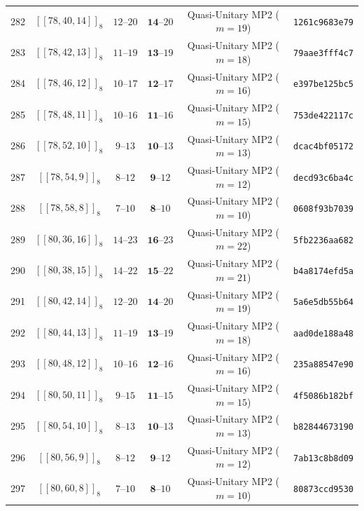 \documentclass[11pt,a4paper]{article}
\theoremstyle{remark}
\begin{document}
{\begin{longtable}{@{}rccccl@{}}
282 & $[[78,40,14]]_{8}$ & $12\text{--}20$ & $\mathbf{14}\text{--}20$ & Quasi-Unitary MP2 ($m=19$) & \texttt{1261c9683e79} \\
283 & $[[78,42,13]]_{8}$ & $11\text{--}19$ & $\mathbf{13}\text{--}19$ & Quasi-Unitary MP2 ($m=18$) & \texttt{79aae3fff4c7} \\
284 & $[[78,46,12]]_{8}$ & $10\text{--}17$ & $\mathbf{12}\text{--}17$ & Quasi-Unitary MP2 ($m=16$) & \texttt{e397be125bc5} \\
285 & $[[78,48,11]]_{8}$ & $10\text{--}16$ & $\mathbf{11}\text{--}16$ & Quasi-Unitary MP2 ($m=15$) & \texttt{753de422117c} \\
286 & $[[78,52,10]]_{8}$ & $9\text{--}13$ & $\mathbf{10}\text{--}13$ & Quasi-Unitary MP2 ($m=13$) & \texttt{dcac4bf05172} \\
287 & $[[78,54,9]]_{8}$ & $8\text{--}12$ & $\mathbf{9}\text{--}12$ & Quasi-Unitary MP2 ($m=12$) & \texttt{decd93c6ba4c} \\
288 & $[[78,58,8]]_{8}$ & $7\text{--}10$ & $\mathbf{8}\text{--}10$ & Quasi-Unitary MP2 ($m=10$) & \texttt{0608f93b7039} \\
289 & $[[80,36,16]]_{8}$ & $14\text{--}23$ & $\mathbf{16}\text{--}23$ & Quasi-Unitary MP2 ($m=22$) & \texttt{5fb2236aa682} \\
290 & $[[80,38,15]]_{8}$ & $14\text{--}22$ & $\mathbf{15}\text{--}22$ & Quasi-Unitary MP2 ($m=21$) & \texttt{b4a8174efd5a} \\
291 & $[[80,42,14]]_{8}$ & $12\text{--}20$ & $\mathbf{14}\text{--}20$ & Quasi-Unitary MP2 ($m=19$) & \texttt{5a6e5db55b64} \\
292 & $[[80,44,13]]_{8}$ & $11\text{--}19$ & $\mathbf{13}\text{--}19$ & Quasi-Unitary MP2 ($m=18$) & \texttt{aad0de188a48} \\
293 & $[[80,48,12]]_{8}$ & $10\text{--}16$ & $\mathbf{12}\text{--}16$ & Quasi-Unitary MP2 ($m=16$) & \texttt{235a88547e90} \\
294 & $[[80,50,11]]_{8}$ & $9\text{--}15$ & $\mathbf{11}\text{--}15$ & Quasi-Unitary MP2 ($m=15$) & \texttt{4f5086b182bf} \\
295 & $[[80,54,10]]_{8}$ & $8\text{--}13$ & $\mathbf{10}\text{--}13$ & Quasi-Unitary MP2 ($m=13$) & \texttt{b82844673190} \\
296 & $[[80,56,9]]_{8}$ & $8\text{--}12$ & $\mathbf{9}\text{--}12$ & Quasi-Unitary MP2 ($m=12$) & \texttt{7ab13c8b8d09} \\
297 & $[[80,60,8]]_{8}$ & $7\text{--}10$ & $\mathbf{8}\text{--}10$ & Quasi-Unitary MP2 ($m=10$) & \texttt{80873ccd9530} \\

\end{longtable}}
\end{document}
